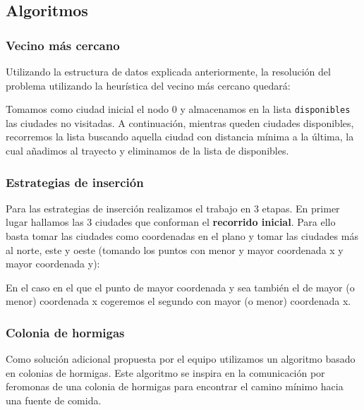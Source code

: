 \subsection{Algoritmos}

\subsubsection{Vecino más cercano}

Utilizando la estructura de datos explicada anteriormente, la resolución del problema
utilizando la heurística del vecino más cercano quedará:



Tomamos como ciudad inicial el nodo 0 y almacenamos en la lista \texttt{disponibles}
las ciudades no visitadas. A continuación, mientras queden ciudades disponibles,
recorremos la lista buscando aquella ciudad con distancia mínima a la última, la
cual añadimos al trayecto y eliminamos de la lista de disponibles.

\subsubsection{Estrategias de inserción}

Para las estrategias de inserción realizamos el trabajo en 3 etapas.
En primer lugar hallamos las 3 ciudades que conforman el \textbf{recorrido inicial}.
Para ello basta tomar las ciudades como coordenadas en el plano y tomar las ciudades
más al norte, este y oeste (tomando los puntos con menor y mayor coordenada x y mayor
coordenada y):



En el caso en el que el punto de mayor coordenada y sea también el de mayor (o menor)
coordenada x cogeremos el segundo con mayor (o menor) coordenada x.


\subsubsection{Colonia de hormigas}

Como solución adicional propuesta por el equipo utilizamos un algoritmo basado en
colonias de hormigas. Este algoritmo se inspira en la comunicación por feromonas
de una colonia de hormigas para encontrar el camino mínimo hacia una fuente de comida. \\

